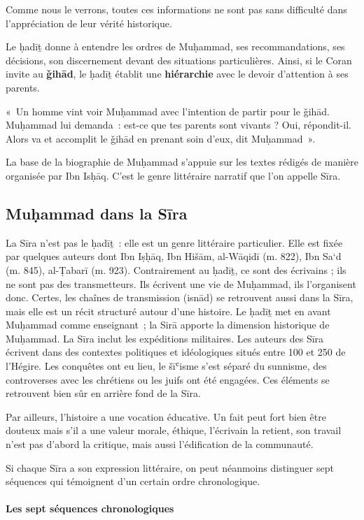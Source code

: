 Comme nous le verrons, toutes ces informations ne sont pas sans
difficulté dans l'appréciation de leur vérité historique.

Le ḥadīṯ donne à entendre les ordres de Muḥammad, ses recommandations,
ses décisions, son discernement devant des situations particulières.
Ainsi, si le Coran invite au \textbf{ǧihād}, le ḥadīṯ établit une
\textbf{hiérarchie} avec le devoir d'attention à ses parents.

{«~Un homme vint voir Muḥammad avec l'intention de partir pour le
ǧihād. Muḥammad lui demanda~: est-ce que tes parents sont vivants ? Oui,
répondit-il. Alors va et accomplit le ǧihād en prenant soin d'eux, dit
Muḥammad~».}

La base de la biographie de Muḥammad s'appuie sur les textes rédigés de
manière organisée par Ibn Isḥāq. C'est le genre littéraire narratif que
l'on appelle Sīra.


\subsection{Muḥammad dans la Sīra
}

La Sīra n'est pas le ḥadīṯ~: elle est un genre littéraire particulier.
Elle est fixée par quelques auteurs dont Ibn Iṣḥāq, Ibn Hišām, al-Wāqidī
(m. 822), Ibn Sa`d (m. 845), al-Ṭabarī (m. 923). Contrairement au ḥadīṯ,
ce sont des écrivains ; ils ne sont pas des transmetteurs. Ils écrivent
une vie de Muḥammad, ils l'organisent donc. Certes, les chaînes de
transmission ({isnād}) se retrouvent aussi dans la Sīra, mais elle
est un récit structuré autour d'une histoire. Le ḥadīṯ met en avant
Muḥammad comme enseignant~; la Sirā apporte la dimension historique de
Muḥammad. La Sīra inclut les expéditions militaires. Les auteurs des
Sīra écrivent dans des contextes politiques et idéologiques situés entre
100 et 250 de l'Hégire. Les conquêtes ont eu lieu, le šīʿisme s'est
séparé du sunnisme, des controverses avec les chrétiens ou les juifs ont
été engagées. Ces éléments se retrouvent bien sûr en arrière fond de la
Sīra.

Par ailleurs, l'histoire a une vocation éducative. Un fait peut fort
bien être douteux mais s'il a une valeur morale, éthique, l'écrivain la
retient, son travail n'est pas d'abord la critique, mais aussi
l'édification de la communauté.

Si chaque Sīra a son expression littéraire, on peut néanmoins distinguer
sept séquences qui témoignent d'un certain ordre chronologique.


\paragraph{Les sept séquences
chronologiques}

